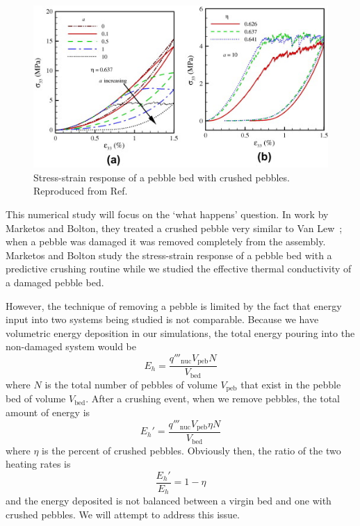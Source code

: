 \begin{figure}[!t]
\centering
	\includegraphics[width=\singleimagewidth]{chapters/figures/annabattula-stress-strain-crushing.jpg}
	\caption{Stress-strain response of a pebble bed with crushed pebbles. Reproduced from Ref.~\cite{Annabattula2012a}}
	\label{fig:annabattula-stress-strain}
\end{figure}

This numerical study will focus on the `what happens' question. In work by Marketos and Bolton, they treated a crushed pebble very similar to Van Lew\etal~; when a pebble was damaged it was removed completely from the assembly.\cite{Marketos2007,VanLew2014} Marketos and Bolton study the stress-strain response of a pebble bed with a predictive crushing routine while we studied the effective thermal conductivity of a damaged pebble bed.

However, the technique of removing a pebble is limited by the fact that energy input into two systems being studied is not comparable. Because we have volumetric energy deposition in our simulations, the total energy pouring into the non-damaged system would be
\begin{equation}
	E_h = \frac{q'''_\text{nuc} V_\text{peb} N}{V_\text{bed}}
\end{equation}
where $N$ is the total number of pebbles of volume $V_\text{peb}$ that exist in the pebble bed of volume $V_\text{bed}$. After a crushing event, when we remove pebbles, the total amount of energy is
\begin{equation}
	E_h' = \frac{q'''_\text{nuc} V_\text{peb} \eta N}{V_\text{bed}}
\end{equation}
where $\eta$ is the percent of crushed pebbles. Obviously then, the ratio of the two heating rates is\begin{equation}
	\frac{E_h'}{E_h} = 1 - \eta
\end{equation}
and the energy deposited is not balanced between a virgin bed and one with crushed pebbles. We will attempt to address this issue.

